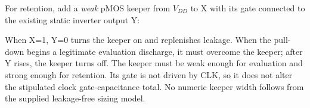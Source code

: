\documentclass[10pt]{article}
\newcommand{\mos}[4]{\begin{scope}[shift={(#1,#2)}]
\draw(0,.24)--(0,-.24);\draw(0,.2)--(.25,.2)--(.25,.5);\draw(0,-.2)--(.25,-.2)--(.25,-.5);
\draw(-.16,.23)--(-.16,-.23);
\ifnum#4=1\draw(-.26,0)circle(.06);\draw(-.75,0)--(-.32,0);\else\draw(-.75,0)--(-.16,0);\fi
\node[anchor=east,font=\scriptsize]at(-.76,0){$#3$};\end{scope}}
\begin{document}
For retention, add a \emph{weak} pMOS keeper from $V_{DD}$ to X with its gate connected to the existing static inverter output Y:
\begin{center}\end{center}
When X=1, Y=0 turns the keeper on and replenishes leakage. When the pull-down begins a legitimate evaluation discharge, it must overcome the keeper; after Y rises, the keeper turns off. The keeper must be weak enough for evaluation and strong enough for retention. Its gate is not driven by CLK, so it does not alter the stipulated clock gate-capacitance total. No numeric keeper width follows from the supplied leakage-free sizing model.
\newpage
\end{document}

